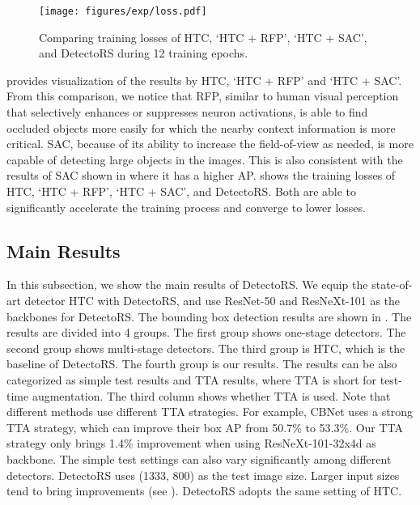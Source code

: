 \documentclass[final]{cvpr}
\begin{document}
\begin{figure}
  \texttt{[image: figures/exp/loss.pdf]}
  \caption{Comparing training losses of HTC, `HTC + RFP', `HTC + SAC', and DetectoRS during 12 training epochs.}
  \label{fig:loss}\end{figure}

 provides visualization of the results by HTC, `HTC + RFP' and `HTC + SAC'.
From this comparison,
we notice that RFP, similar to human visual perception that selectively enhances or suppresses neuron activations, is able to find occluded objects more easily for which the nearby context information is more critical.
SAC, because of its ability to increase the field-of-view as needed, is more capable of detecting large objects in the images.
This is also consistent with the results of SAC shown in  where it has a higher AP.
 shows the training losses of HTC, `HTC + RFP', `HTC + SAC', and DetectoRS.
Both are able to significantly accelerate the training process and converge to lower losses.

\subsection{Main Results}

In this subsection, we show the main results of DetectoRS.
We equip the state-of-art detector HTC with DetectoRS, and use ResNet-50 and ResNeXt-101 as the backbones for DetectoRS.
The bounding box detection results are shown in .
The results are divided into 4 groups.
The first group shows one-stage detectors.
The second group shows multi-stage detectors.
The third group is HTC, which is the baseline of DetectoRS.
The fourth group is our results.
The results can be also categorized as simple test results and TTA results, where TTA is short for test-time augmentation.
The third column shows whether TTA is used.
Note that different methods use different TTA strategies.
For example, CBNet uses a strong TTA strategy, which can improve their box AP from 50.7\% to 53.3\%.
Our TTA strategy only brings 1.4\% improvement when using ResNeXt-101-32x4d as backbone.
The simple test settings can also vary significantly among different detectors.
DetectoRS uses (1333, 800) as the test image size.
Larger input sizes tend to bring improvements (see \cite{efficientdet}).
DetectoRS adopts the same setting of HTC.
\end{document}
